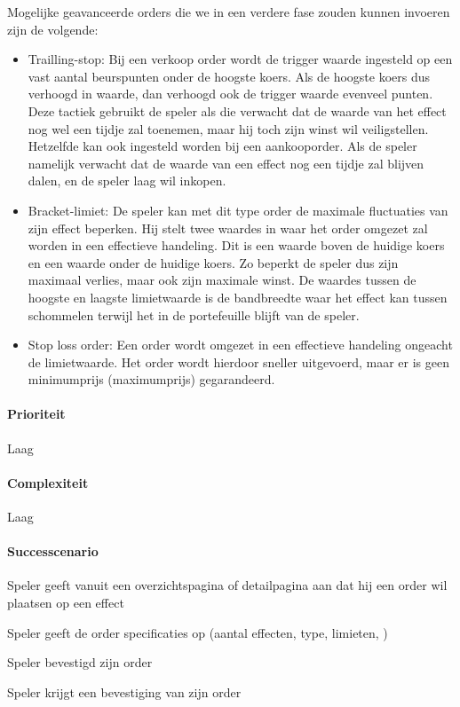 \begin{compact}
Mogelijke geavanceerde orders die we in een verdere fase zouden kunnen invoeren zijn de volgende:
\begin{itemize}
	\item Trailling-stop: Bij een verkoop order wordt de trigger waarde ingesteld op een vast aantal beurspunten onder de hoogste koers. Als de hoogste koers dus verhoogd in waarde, dan verhoogd ook de trigger waarde evenveel punten. Deze tactiek gebruikt de speler als die verwacht dat de waarde van het effect nog wel een tijdje zal toenemen, maar hij toch zijn winst wil veiligstellen. Hetzelfde kan ook ingesteld worden bij een aankooporder. Als de speler namelijk verwacht dat de waarde van een effect nog een tijdje zal blijven dalen, en de speler laag wil inkopen.
  \item Bracket-limiet: De speler kan met dit type order de maximale fluctuaties van zijn effect beperken. Hij stelt twee waardes in waar het order omgezet zal worden in een effectieve handeling. Dit is een waarde boven de huidige koers en een waarde onder de huidige koers. Zo beperkt de speler dus zijn maximaal verlies, maar ook zijn maximale winst. De waardes tussen de hoogste en laagste limietwaarde is de bandbreedte waar het effect kan tussen schommelen terwijl het in de portefeuille blijft van de speler.
  \item Stop loss order: Een order wordt omgezet in een effectieve handeling ongeacht de limietwaarde. Het order wordt hierdoor sneller uitgevoerd, maar er is geen minimumprijs (maximumprijs) gegarandeerd.
\end{itemize}
\paragraph{Prioriteit}Laag
\paragraph{Complexiteit}Laag
\paragraph{Successcenario}
\begin{enumerate_compact}
 \item Speler geeft vanuit een overzichtspagina of detailpagina aan dat hij een order wil plaatsen op een effect
 \item Speler geeft de order specificaties op (aantal effecten, type, limieten, )
 \item Speler bevestigd zijn order
 \item \label{def:aankopen:bevestiging} Speler krijgt een bevestiging van zijn order
\end{enumerate_compact}

\end{compact}
